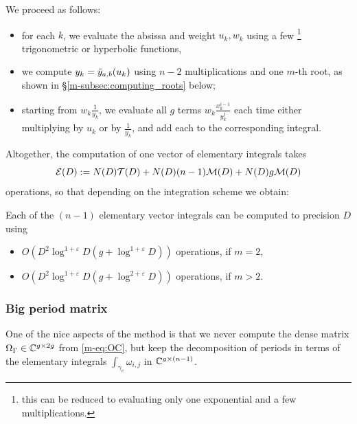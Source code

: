 \documentclass[main.tex]{subfiles}
\begin{document}
   We proceed as follows:
   \begin{itemize}
   \item for each $k$, we evaluate the absissa and weight $u_k,w_k$ using
       a few \footnote{this can be reduced to evaluating only one exponential
       and a few multiplications.} trigonometric or hyperbolic functions,
   \item we compute $y_k=\tilde{y}_{a,b}(u_k)$ using $n-2$ multiplications and one $m$-th root,
       as shown in \S \ref{m-subsec:computing_roots} below;
   \item starting from $w_k\frac{1}{y_k}$, we evaluate all $g$ terms $w_k\frac{x_k^{i-1}}{y_k^j}$
       each time either multiplying by $u_k$ or by $\frac{1}{y_k}$, and add each to the corresponding
       integral.
   \end{itemize}

   Altogether, the computation of one vector of elementary integrals takes
   \begin{equation}\label{eq:elem_int_complexity}
    \mathcal E(D) := N(D)\mathcal T(D)+N(D)(n-1)\mathcal M(D)+N(D)g\mathcal M(D)
   \end{equation}
    operations,
   so that depending on the integration scheme we obtain:
   \begin{thm}\label{thm:complexity_integrals}
       Each of the $(n-1)$ elementary vector integrals can be computed to precision $D$ using
       \begin{itemize}
           \item $O(D^2\log^{1+\varepsilon} D (g + \log^{1+\varepsilon} D))$ operations, if $m=2$,
           \item $O(D^2\log^{1+\varepsilon} D (g + \log^{2+\varepsilon} D))$ operations, if $m>2$.
       \end{itemize}
   \end{thm}


   \subsubsection{Big period matrix}

   One of the nice aspects of the method is that we never compute
   the dense matrix $\Omega_{\Gamma}\in\mathbb{C}^{g\times 2g}$ from \eqref{m-eq:OC}, but
   keep the decomposition of periods in terms of the elementary integrals
   $\int_{\gamma_e}\omega_{i,j}$ in $\mathbb{C}^{g\times (n-1)}$.
\end{document}
